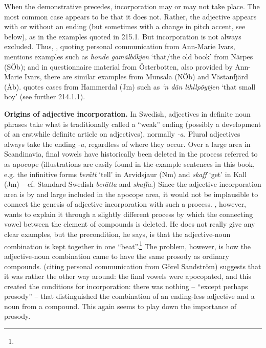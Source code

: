 \begin{styleBodyTextFirst}
When the demonstrative precedes, incorporation may or may not take place. The most common case appears to be that it does not. Rather, the adjective appears with or without an ending (but sometimes with a change in pitch accent, see below), as in the examples quoted in 215.1. But incorporation is not always excluded. Thus, \citet[159]{Vangsnes2003}, quoting personal communication from Ann-Marie Ivars, mentions examples such as\textit{ honde gamälbókjen} ‘that/the old book’ from Närpes (SÖb); and in questionnaire material from Österbotten, also provided by Ann-Marie Ivars, there are similar examples from Munsala (NÖb) and Västanfjärd (Åb). \citet[38]{Reinhammar2005} quotes cases from Hammerdal (Jm) such as \textit{‘n dân li{\textasciigrave}hllpöytjen }‘that small boy’ (see further 214.1.1).

\end{styleBodyTextFirst}

\begin{styleBodytextC}
\textbf{Origins of adjective incorporation.} In Swedish, adjectives in definite noun phrases take what is traditionally called a “weak” ending (possibly a development of an erstwhile definite article on adjectives), normally\textit{ -a}\textit{. }Plural adjectives always take the ending\textit{ -a}, regardless of where they occur. Over a large area in Scandinavia, final vowels have historically been deleted in the process referred to as apocope (illustrations are easily found in the example sentences in this book, e.g. the infinitive forms \textit{berätt} ‘tell’ in Arvidsjaur (Nm) and \textit{skaff} ‘get’ in Kall (Jm) – cf. Standard Swedish \textit{berätta} and \textit{skaffa}.) Since the adjective incorporation area is by and large included in the apocope area, it would not be implausible to connect the genesis of adjective incorporation with such a process. \citet[102]{Dahlstedt1962}, however, wants to explain it through a slightly different process by which the connecting vowel between the element of compounds is deleted. He does not really give any clear examples, but the precondition, he says, is that the adjective-noun combination is kept together in one “beat”.\footnote{} The problem, however, is how the adjective-noun combination came to have the same prosody as ordinary compounds. \citet[159]{Vangsnes2003} (citing personal communication from Görel Sandström) suggests that it was rather the other way around: the final vowels were apocopated, and this created the conditions for incorporation: there was nothing – “except perhaps prosody” – that distinguished the combination of an ending-less adjective and a noun from a compound. This again seems to play down the importance of prosody.

\end{styleBodytextC}

